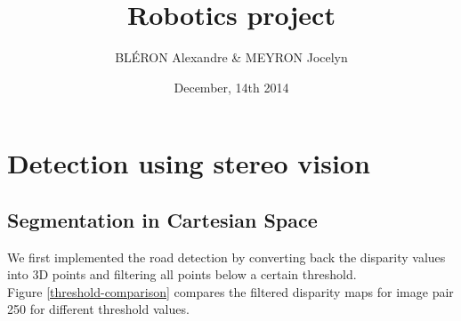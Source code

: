 \documentclass[a4paper,11pt]{article}
\title{Robotics project}
\author{BLÉRON Alexandre \& MEYRON Jocelyn}
\date{December, 14th 2014}
\begin{document}
\maketitle

\section{Detection using stereo vision}
\subsection{Segmentation in Cartesian Space}
We first implemented the road detection by converting back the disparity values into 3D points and filtering all points below a certain threshold.\\
Figure \ref{threshold-comparison} compares the filtered disparity maps for image pair 250 for different threshold values.
\end{document}
